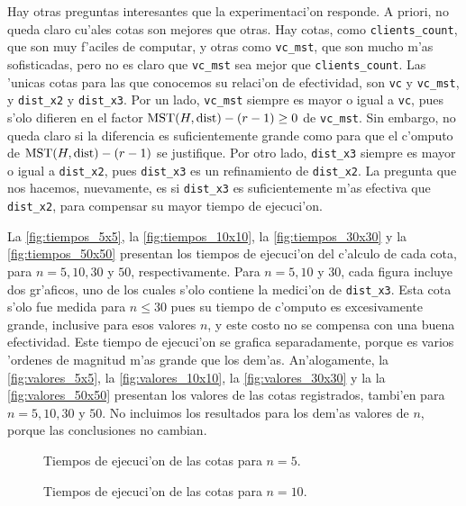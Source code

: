 Hay otras preguntas interesantes que la experimentaci'on responde. A priori, no queda claro cu'ales cotas son mejores que otras. Hay cotas, como \texttt{clients\_count}, que son muy f'aciles de computar, y otras como \texttt{vc\_mst}, que son mucho m'as sofisticadas, pero no es claro que \texttt{vc\_mst} sea mejor que \texttt{clients\_count}. Las 'unicas cotas para las que conocemos su relaci'on de efectividad, son \texttt{vc} y \texttt{vc\_mst}, y \texttt{dist\_x2} y \texttt{dist\_x3}. Por un lado, \texttt{vc\_mst} siempre es mayor o igual a \texttt{vc}, pues s'olo difieren en el factor $\textnormal{MST}(H, \textnormal{dist}) - (r - 1) \geq 0$ de \texttt{vc\_mst}. Sin embargo, no queda claro si la diferencia es suficientemente grande como para que el c'omputo de $\textnormal{MST}(H, \textnormal{dist}) - (r - 1)$ se justifique. Por otro lado, \texttt{dist\_x3} siempre es mayor o igual a \texttt{dist\_x2}, pues \texttt{dist\_x3} es un refinamiento de \texttt{dist\_x2}. La pregunta que nos hacemos, nuevamente, es si \texttt{dist\_x3} es suficientemente m'as efectiva que \texttt{dist\_x2}, para compensar su mayor tiempo de ejecuci'on.

La \autoref{fig:tiempos_5x5}, la \autoref{fig:tiempos_10x10}, la \autoref{fig:tiempos_30x30} y la \autoref{fig:tiempos_50x50} presentan los tiempos de ejecuci'on del c'alculo de cada cota, para $n = 5, 10, 30$ y $50$, respectivamente. Para $n = 5, 10$ y $30$, cada figura incluye dos gr'aficos, uno de los cuales s'olo contiene la medici'on de \texttt{dist\_x3}. Esta cota s'olo fue medida para $n \leq 30$ pues su tiempo de c'omputo es excesivamente grande, inclusive para esos valores $n$, y este costo no se compensa con una buena efectividad. Este tiempo de ejecuci'on se grafica separadamente, porque es varios 'ordenes de magnitud m'as grande que los dem'as. An'alogamente, la \autoref{fig:valores_5x5}, la \autoref{fig:valores_10x10}, la \autoref{fig:valores_30x30} y la la \autoref{fig:valores_50x50} presentan los valores de las cotas registrados, tambi'en para $n = 5, 10, 30$ y $50$. No incluimos los resultados para los dem'as valores de $n$, porque las conclusiones no cambian.

\begin{figure}[h]
	
	
	\caption{Tiempos de ejecuci'on de las cotas para $n = 5$.}
	\label{fig:tiempos_5x5}
\end{figure}

\begin{figure}[h]
	
	
	\caption{Tiempos de ejecuci'on de las cotas para $n = 10$.}
	\label{fig:tiempos_10x10}
\end{figure}


